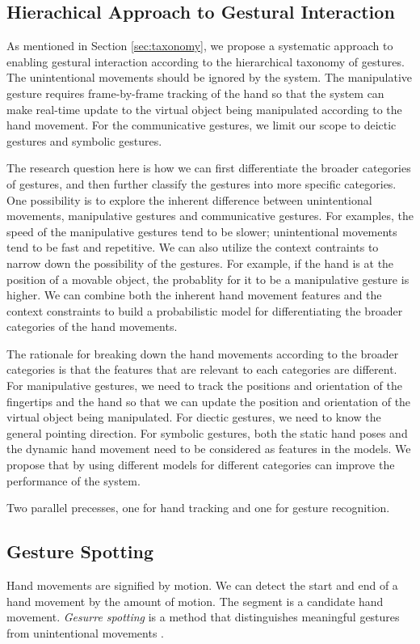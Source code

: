 \subsection{Hierachical Approach to Gestural Interaction}
As mentioned in Section \ref{sec:taxonomy}, we propose a systematic approach to
enabling gestural interaction according to the hierarchical taxonomy of
gestures. The unintentional movements should be ignored by the system. The
manipulative gesture requires frame-by-frame tracking of the hand so that the system can make
real-time update to the virtual object being manipulated according to the hand
movement. For the communicative gestures, we limit our scope to deictic gestures
and symbolic gestures. 

The research question here is how we can first differentiate the broader
categories of gestures, and then further classify the gestures into more 
specific categories. One possibility is to explore the inherent difference
between unintentional movements, manipulative gestures and communicative
gestures. For examples, the speed of the manipulative gestures tend to be
slower; unintentional movements tend to be fast and repetitive. We can also
utilize the context contraints to narrow down the possibility of the gestures.
For example, if the hand is at the position of a movable object, the probablity
for it to be a manipulative gesture is higher. We can combine both the inherent
hand movement features and the context constraints to build a probabilistic
model for differentiating the broader categories of the hand movements.

The rationale for breaking down the hand movements according to the broader
categories is that the features that are relevant to each categories are
different. For manipulative gestures, we need to track the positions and 
orientation of the fingertips and the hand so that we can update the position 
and orientation of the virtual object being manipulated. For diectic gestures, 
we need to know the general pointing direction. For symbolic gestures, both the 
static hand poses and the dynamic hand movement need to be considered as 
features in the models. We propose that by using different models for
different categories can improve the performance of the system. 

Two parallel precesses, one for hand tracking and one for gesture recognition.

\subsection{Gesture Spotting}
Hand movements are signified by motion. We can detect the start
and end of a hand movement by the amount of motion. The segment is a candidate
hand movement. \textit{Gesurre spotting} is a method that distinguishes
meaningful gestures from unintentional movements \cite{kang04}.

